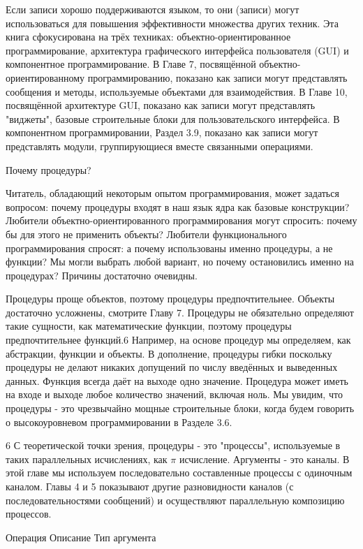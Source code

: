 Если записи хорошо поддерживаются языком, то они (записи) могут использоваться для повышения эффективности множества других техник. Эта книга сфокусирована на трёх техниках: объектно-ориентированное программирование, архитектура графического интерфейса пользователя (GUI) и компонентное программирование. В Главе 7, посвящённой объектно-ориентированному программированию, показано как записи могут представлять сообщения и методы, используемые объектами для взаимодействия. В Главе 10, посвящённой архитектуре GUI, показано как записи могут представлять "виджеты", базовые строительные блоки для пользовательского интерфейса. В компонентном программировании, Раздел 3.9, показано как записи могут представлять модули, группирующиеся вместе связанными операциями.

Почему процедуры?

Читатель, обладающий некоторым опытом программирования, может задаться вопросом: почему процедуры входят в наш язык ядра как базовые конструкции? Любители объектно-ориентированного программирования могут спросить: почему бы для этого не применить объекты? Любители функционального программирования спросят: а почему использованы именно процедуры, а не функции? Мы могли выбрать любой вариант, но почему остановились именно на процедурах? Причины достаточно очевидны.

Процедуры проще объектов, поэтому процедуры предпочтительнее. Объекты достаточно усложнены, смотрите Главу 7. Процедуры не обязательно определяют такие сущности, как математические функции, поэтому процедуры предпочтительнее функций.6 Например, на основе процедур мы определяем, как абстракции, функции и объекты. В дополнение, процедуры гибки поскольку процедуры не делают никаких допущений по числу введённых и выведенных данных. Функция всегда даёт на выходе одно значение. Процедура может иметь на входе и выходе любое количество значений, включая ноль. Мы увидим, что процедуры - это чрезвычайно мощные строительные блоки, когда будем говорить о высокоуровневом программировании в Разделе 3.6.

6 С теоретической точки зрения, процедуры - это "процессы", используемые в таких параллельных исчислениях, как $\pi$ исчисление. Аргументы - это каналы. В этой главе мы используем последовательно составленные процессы с одиночным каналом. Главы 4 и 5 показывают другие разновидности каналов (с последовательностями сообщений) и осуществляют параллельную композицию процессов.

Операция Описание Тип аргумента

